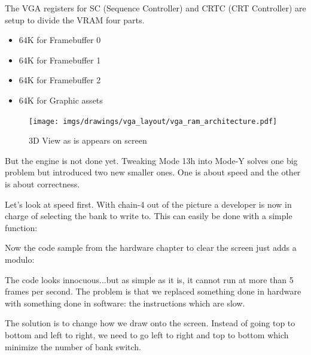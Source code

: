 \documentclass[book.tex]{subfiles}
\begin{document}
 \par
 \begin{minipage}{\textwidth}

\end{minipage}
 \par
 The VGA registers for SC (Sequence Controller) and CRTC (CRT Controller) are setup to divide the VRAM four parts.
 \begin{itemize}\label{SetupPages}
 \item 64K for Framebuffer 0
 \item 64K for Framebuffer 1
 \item 64K for Framebuffer 2
 \item 64K for Graphic assets
\end{itemize}
\par
\begin{figure}[H]
\centering
 \texttt{[image: imgs/drawings/vga\_layout/vga\_ram\_architecture.pdf]}
 \caption{3D View as is appears on screen} \label{fig:vga_layout_in_3D}
 \end{figure}
\par
But the engine is not done yet. Tweaking Mode 13h into Mode-Y solves one big problem but introduced two new smaller ones. One is about speed and the other is about correctness.\\
\par
Let's look at speed first. With chain-4 out of the picture a developer is now in charge of selecting the bank to write to. This can easily be done with a simple function:\\
\par
 \par
 \begin{minipage}{\textwidth}

\end{minipage}
 \par

Now the code sample from the hardware chapter to clear the screen just adds a modulo:\\
\par
\par
\begin{minipage}{\textwidth}

\end{minipage}
\par
The code looks innocuous...but as simple as it is, it cannot run at more than 5 frames per second. The problem is that we replaced something done in hardware with something done in software: the  instructions which are slow.\\
\par
The solution is to change how we draw onto the screen. Instead of going top to bottom and left to right, we need to go left to right and top to bottom which minimize the number of bank switch.\\
\par
\begin{minipage}{\textwidth}

\end{minipage}
\end{document}
